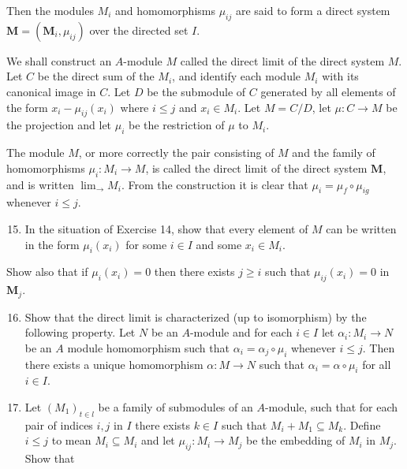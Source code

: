 \documentclass{standalone}
\theoremstyle{definition}
\theoremstyle{remark}
\begin{document}
Then the modules $M_{i}$ and homomorphisms $\mu_{i j}$ are said to form a direct system $\mathbf{M}=\left(\boldsymbol{M}_{i}, \mu_{i j}\right)$ over the directed set $I$.

We shall construct an $A$-module $M$ called the direct limit of the direct system $M$. Let $C$ be the direct sum of the $M_{i}$, and identify each module $M_{i}$ with its canonical image in $C$. Let $D$ be the submodule of $C$ generated by all elements of the form $x_{i}-\mu_{i j}\left(x_{i}\right)$ where $i \leqslant j$ and $x_{i} \in M_{i}$. Let $M=C / D$, let $\mu: C \rightarrow M$ be the projection and let $\mu_{i}$ be the restriction of $\mu$ to $M_{i}$.

The module $M$, or more correctly the pair consisting of $M$ and the family of homomorphisms $\mu_{i}: M_{i} \rightarrow M$, is called the direct limit of the direct system $\mathbf{M}$, and is written $\lim _{\rightarrow} M_{i}$. From the construction it is clear that $\mu_{i}=\mu_{f} \circ \mu_{i g}$ whenever $i \leqslant j$.

\begin{enumerate}
  \setcounter{enumi}{14}
  \item In the situation of Exercise 14, show that every element of $M$ can be written in the form $\mu_{i}\left(x_{i}\right)$ for some $i \in I$ and some $x_{i} \in M_{i}$.
\end{enumerate}

Show also that if $\mu_{i}\left(x_{i}\right)=0$ then there exists $j \geqslant i$ such that $\mu_{i j}\left(x_{i}\right)=0$ in $\boldsymbol{M}_{j}$.

\begin{enumerate}
  \setcounter{enumi}{15}
  \item Show that the direct limit is characterized (up to isomorphism) by the following property. Let $N$ be an $A$-module and for each $i \in I$ let $\alpha_{i}: M_{i} \rightarrow N$ be an $A$ module homomorphism such that $\alpha_{i}=\alpha_{j} \circ \mu_{i}$ whenever $i \leqslant j$. Then there exists a unique homomorphism $\alpha: M \rightarrow N$ such that $\alpha_{i}=\alpha \circ \mu_{i}$ for all $i \in I$.

  \item Let $\left(M_{1}\right)_{t \in l}$ be a family of submodules of an $A$-module, such that for each pair of indices $i, j$ in $I$ there exists $k \in I$ such that $M_{i}+M_{1} \subseteq M_{k}$. Define $i \leqslant j$ to mean $M_{i} \subseteq M_{i}$ and let $\mu_{i j}: M_{i} \rightarrow M_{j}$ be the embedding of $M_{i}$ in $M_{j}$. Show that

\end{enumerate}
\end{document}
